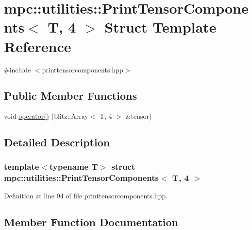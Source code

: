 \hypertarget{structmpc_1_1utilities_1_1_print_tensor_components_3_01_t_00_014_01_4}{}\section{mpc\+:\+:utilities\+:\+:Print\+Tensor\+Components$<$ T, 4 $>$ Struct Template Reference}
\label{structmpc_1_1utilities_1_1_print_tensor_components_3_01_t_00_014_01_4}


{\ttfamily \#include $<$printtensorcomponents.\+hpp$>$}

\subsection*{Public Member Functions}
\begin{DoxyCompactItemize}
\item 
void \mbox{\hyperlink{structmpc_1_1utilities_1_1_print_tensor_components_3_01_t_00_014_01_4_ab5500a50f0c6119ee98075cbaad6a51e}{operator()}} (blitz\+::\+Array$<$ T, 4 $>$ \&tensor)
\end{DoxyCompactItemize}


\subsection{Detailed Description}
\subsubsection*{template$<$typename T$>$\newline
struct mpc\+::utilities\+::\+Print\+Tensor\+Components$<$ T, 4 $>$}



Definition at line 94 of file printtensorcomponents.\+hpp.



\subsection{Member Function Documentation}
\mbox{\label{structmpc_1_1utilities_1_1_print_tensor_components_3_01_t_00_014_01_4_ab5500a50f0c6119ee98075cbaad6a51e}} 
